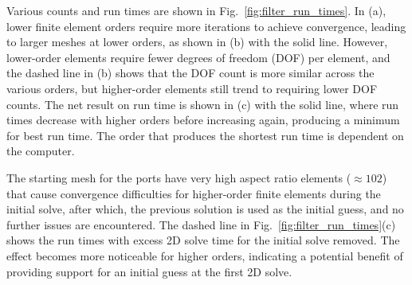 \documentclass[titlepage]{article}
\renewcommand\_{\textunderscore\linebreak[1]}
\begin{document}
Various counts and run times are shown in Fig.~\ref{fig:filter_run_times}. In (a), lower finite element orders require more iterations to achieve convergence, leading to larger meshes at lower orders, as shown in (b) with the solid line.  However, lower-order elements require fewer degrees of freedom (DOF) per element, and the dashed line in (b) shows that the DOF count is more similar across the various orders, but higher-order elements still trend to requiring lower DOF counts.  The net result on run time is shown in (c) with the solid line, where run times decrease with higher orders before increasing again, producing a minimum for best run time.  The order that produces the shortest run time is dependent on the computer.  

The starting mesh for the ports have very high aspect ratio elements ($\approx 102$) that cause convergence difficulties for higher-order finite elements during the initial solve, after which, the previous solution is used as the initial guess, and no further issues are encountered.  The dashed line in Fig.~\ref{fig:filter_run_times}(c) shows the run times with excess 2D solve time for the initial solve removed.  The effect becomes more noticeable for higher orders, indicating a potential benefit of providing support for an initial guess at the first 2D solve.
\end{document}
